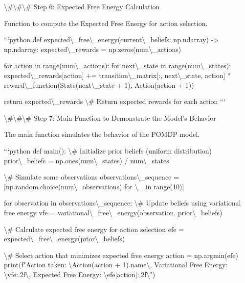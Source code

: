 \documentclass[11pt,a4paper]{article}
\begin{document}
\textbackslash{}#\textbackslash{}#\textbackslash{}# Step 6: Expected Free Energy Calculation

Function to compute the Expected Free Energy for action selection.

```python
def expected\textbackslash{}_free\textbackslash{}_energy(current\textbackslash{}_beliefs: np.ndarray) -\textgreater{} np.ndarray:
    expected\textbackslash{}_rewards = np.zeros(num\textbackslash{}_actions)
    
    for action in range(num\textbackslash{}_actions):
        for next\textbackslash{}_state in range(num\textbackslash{}_states):
            expected\textbackslash{}_rewards[action] += transition\textbackslash{}_matrix[:, next\textbackslash{}_state, action] * reward\textbackslash{}_function(State(next\textbackslash{}_state + 1), Action(action + 1))
    
    return expected\textbackslash{}_rewards  \textbackslash{}# Return expected rewards for each action
```

\textbackslash{}#\textbackslash{}#\textbackslash{}# Step 7: Main Function to Demonstrate the Model's Behavior

The main function simulates the behavior of the POMDP model.

```python
def main():
    \textbackslash{}# Initialize prior beliefs (uniform distribution)
    prior\textbackslash{}_beliefs = np.ones(num\textbackslash{}_states) / num\textbackslash{}_states

    \textbackslash{}# Simulate some observations
    observations\textbackslash{}_sequence = [np.random.choice(num\textbackslash{}_observations) for \textbackslash{}_ in range(10)]

    for observation in observations\textbackslash{}_sequence:
        \textbackslash{}# Update beliefs using variational free energy
        vfe = variational\textbackslash{}_free\textbackslash{}_energy(observation, prior\textbackslash{}_beliefs)

        \textbackslash{}# Calculate expected free energy for action selection
        efe = expected\textbackslash{}_free\textbackslash{}_energy(prior\textbackslash{}_beliefs)

        \textbackslash{}# Select action that minimizes expected free energy
        action = np.argmin(efe)
        print(f"Action taken: \textbackslash{}{Action(action + 1).name\textbackslash{}}, Variational Free Energy: \textbackslash{}{vfe:.2f\textbackslash{}}, Expected Free Energy: \textbackslash{}{efe[action]:.2f\textbackslash{}}")
\end{document}
